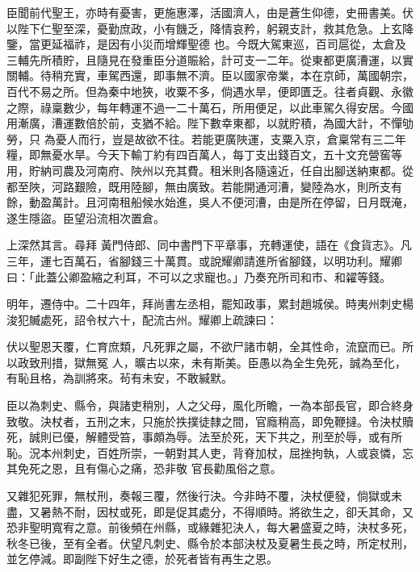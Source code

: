 \begin{pinyinscope}
 臣聞前代聖王，亦時有憂害，更施惠澤，活國濟人，由是蒼生仰德，史冊書美。伏以陛下仁聖至深，憂勤庶政，小有饑乏，降情哀矜，躬親支計，救其危急。上玄降鑒，當更延福祚，是因有小災而增輝聖德
 也。今既大駕東巡，百司扈從，太倉及三輔先所積貯，且隨見在發重臣分道賑給，計可支一二年。從東都更廣漕運，以實關輔。待稍充實，車駕西還，即事無不濟。臣以國家帝業，本在京師，萬國朝宗，百代不易之所。但為秦中地狹，收粟不多，倘遇水旱，便即匱乏。往者貞觀、永徽之際，祿稟數少，每年轉運不過一二十萬石，所用便足，以此車駕久得安居。今國用漸廣，漕運數倍於前，支猶不給。陛下數幸東都，以就貯積，為國大計，不憚劬勞，只
 為憂人而行，豈是故欲不往。若能更廣陜運，支粟入京，倉稟常有三二年糧，即無憂水旱。今天下輸丁約有四百萬人，每丁支出錢百文，五十文充營窖等用，貯納司農及河南府、陜州以充其費。租米則各隨遠近，任自出腳送納東都。從都至陜，河路艱險，既用陸腳，無由廣致。若能開通河漕，變陸為水，則所支有餘，動盈萬計。且河南租船候水始進，吳人不便河漕，由是所在停留，日月既淹，遂生隱盜。臣望沿流相次置倉。



 上深然其言。尋拜
 黃門侍郎、同中書門下平章事，充轉運使，語在《食貨志》。凡三年，運七百萬石，省腳錢三十萬貫。或說耀卿請進所省腳錢，以明功利。耀卿曰：「此蓋公卿盈縮之利耳，不可以之求寵也。」乃奏充所司和市、和糴等錢。



 明年，遷侍中。二十四年，拜尚書左丞相，罷知政事，累封趙城侯。時夷州刺史楊浚犯贓處死，詔令杖六十，配流古州。耀卿上疏諫曰：



 伏以聖恩天覆，仁育庶類，凡死罪之屬，不欲尸諸市朝，全其性命，流竄而已。所以政致刑措，獄無冤
 人，曠古以來，未有斯美。臣愚以為全生免死，誠為至化，有恥且格，為訓將來。茍有未安，不敢緘默。



 臣以為刺史、縣令，與諸吏稍別，人之父母，風化所瞻，一為本部長官，即合終身致敬。決杖者，五刑之末，只施於抶撲徒隸之間，官廕稍高，即免鞭撻。令決杖贖死，誠則已優，解體受笞，事頗為辱。法至於死，天下共之，刑至於辱，或有所恥。況本州刺史，百姓所崇，一朝對其人吏，背脊加杖，屈挫拘執，人或哀憐，忘其免死之恩，且有傷心之痛，恐非敬
 官長勸風俗之意。



 又雜犯死罪，無杖刑，奏報三覆，然後行決。今非時不覆，決杖便發，倘獄或未盡，又暑熱不耐，因杖或死，即是促其處分，不得順時。將欲生之，卻夭其命，又恐非聖明寬宥之意。前後頻在州縣，或緣雜犯決人，每大暑盛夏之時，決杖多死，秋冬已後，至有全者。伏望凡刺史、縣令於本部決杖及夏暑生長之時，所定杖刑，並乞停減。即副陛下好生之德，於死者皆有再生之恩。




\end{pinyinscope}
